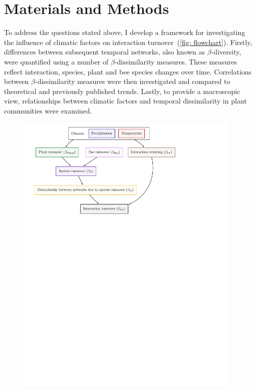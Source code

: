 \documentclass[11pt]{article}
\begin{document}
\newpage
\section{Materials and Methods} %

To address the questions stated above, I develop a framework for investigating the influence of climatic factors on interaction turnover~(\autoref{fig: flowchart}). Firstly, differences between subsequent temporal networks, also known as $\beta$-diversity, were quantified using a number of $\beta$-dissimilarity measures. These measures reflect interaction, species, plant and bee species changes over time. Correlations between $\beta$-dissimilarity measures were then investigated and compared to theoretical and previously published trends. Lastly, to provide a macroscopic view, relationships between climatic factors and temporal dissimilarity in plant communities were examined.\\

\begin{figure}[h]
  \centering
    \includegraphics[width=0.96\textwidth]{flowchart2.pdf} \\
    \label{fig: flowchart}
\end{figure}
\vspace{-0.3cm}
\end{document}
